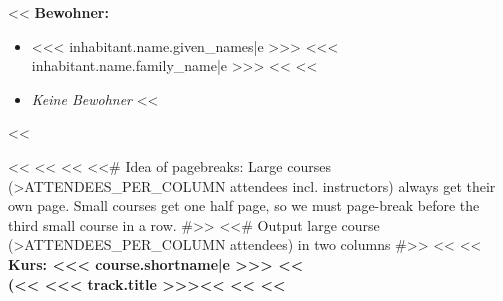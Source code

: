         \setlength{\columnsep}{2cm}
        \begin{minipage}[t]{0.5\textwidth}
            <<%
                {
                    \headingfamily\bfseries Bewohner:
                }
                \begin{itemize}
                    <<%
                            if inhabitant.parts[part].status == ENUMS.RegistrationPartStati.participant -%
                        \item <<< inhabitant.name.given_names|e >>> <<< inhabitant.name.family_name|e >>>
                            <<%
                    <<%
                        \item \textit{Keine Bewohner}
                    <<%
                \end{itemize}
            <<%
        \end{minipage}%
        <<%
        <<%
            <<%
            <<# Idea of pagebreaks: Large courses (>ATTENDEES_PER_COLUMN attendees incl. instructors) always get their
                own page. Small courses get one half page, so we must page-break before the third small course in a row.
                #>>
            <<# Output large course (>ATTENDEES_PER_COLUMN attendees) in two columns #>>
            <<%
                <<%
                {\headingfamily\bfseries
                    Kurs: <<< course.shortname|e >>>
                    <<%
                        \\\mdseries
                        (<<%
                            <<< track.title >>><<%
                         <<%
                    <<%
                    \vspace{0.6\baselineskip}
                }

